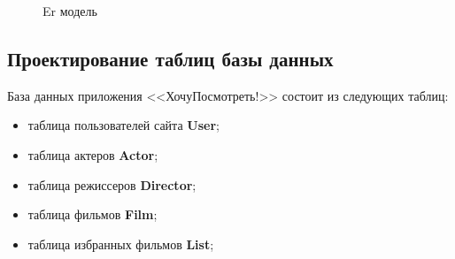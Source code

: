 \documentclass[a4paper, 14pt]{article}
\begin{document}
	\begin{figure}[h!]
		\caption{Er модель}
		\label{er-model}
	\end{figure}
	
	\subsection{Проектирование таблиц базы данных}
	
	База данных приложения <<ХочуПосмотреть!>> состоит из следующих таблиц:
	\begin{itemize}
		\item таблица пользователей сайта {\bf User};
		\item таблица актеров {\bf Actor};
		\item таблица режиссеров {\bf Director};
		\item таблица фильмов {\bf Film};
		\item таблица избранных фильмов {\bf List};
	\end{itemize}
	
\end{document}
